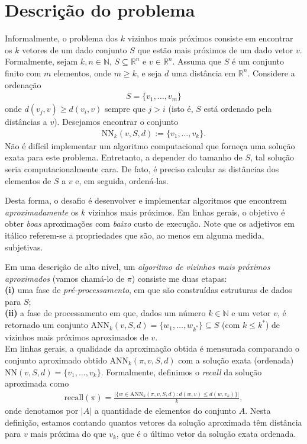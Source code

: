 \documentclass[a4paper,12pt,titlepage]{scrartcl}
\begin{document}
\section{Descrição do problema}

Informalmente, o problema dos $k$ vizinhos mais próximos consiste em encontrar os $k$ vetores de um dado conjunto $S$ que estão mais próximos de um dado vetor $v$. Formalmente, sejam $k,n \in \mathbb{N}$, $S \subseteq \mathbb{R}^n$ e $v \in \mathbb{R}^n$. Assuma que $S$ é um conjunto finito com $m$ elementos, onde $m \geq k$, e seja $d$ uma distância em $\mathbb{R}^n$. Considere a ordenação
\begin{align*} S = \{v_1,\ldots,v_m\}
\end{align*} 
onde $d(v_j,v) \geq d(v_i,v)$ sempre que $j > i$ (isto é, $S$ está ordenado pela distâncias a $v$). Desejamos encontrar o conjunto
\begin{align*} \mathrm{NN}_k(v,S,d) := \{v_1,\ldots,v_k\}. 
\end{align*}
Não é difícil implementar um algoritmo computacional que forneça uma solução exata para este problema. Entretanto, a depender do tamanho de $S$, tal solução seria computacionalmente cara. De fato, é preciso calcular as distâncias dos elementos de $S$ a $v$ e, em seguida, ordená-las.

Desta forma, o desafio é desenvolver e implementar algoritmos que encontrem \emph{aproximadamente} os $k$ vizinhos mais próximos. Em linhas gerais, o objetivo é obter \emph{boas} aproximações com \emph{baixo} custo de execução. Note que os adjetivos em itálico referem-se a propriedades que são, ao menos em alguma medida, subjetivas. 

Em uma descrição de alto nível, um \emph{algoritmo de vizinhos mais próximos aproximados} (vamos chamá-lo de $\pi$) consiste me duas etapas: \\

\noindent\textbf{(i)} uma fase de \emph{pré-processamento}, em que são construídas estruturas de dados para $S$;\\

\noindent\textbf{(ii)} a fase de processamento em que, dados um número $k \in \mathbb{N}$ e um vetor $v$, é retornado um conjunto $\mathrm{ANN}_k(v,S,d)=\{w_1,\ldots,w_{k^*}\} \subseteq S$ (com $k \leq k^*$) de vizinhos mais próximos aproximados de $v$. \\

Em linhas gerais, a qualidade da aproximação obtida é mensurada comparando o conjunto aproximado obtido $\mathrm{ANN}_k(\pi,v,S,d)$ com a solução exata (ordenada) $\mathrm{NN}(v,S,d) = \{v_1,\ldots,v_k\}$. Formalmente, definimos o \emph{recall} da solução aproximada como
\begin{align*} \mathrm{recall}(\pi) = \frac{\Big|\Big\{w \in \mathrm{ANN}_k(\pi,v,S,d) \colon d(w,v) \leq d(w,v_k)\Big\}\Big|}{k},
\end{align*}
onde denotamos por $|A|$ a quantidade de elementos do conjunto $A$. Nesta definição, estamos contando quantos vetores da solução aproximada têm distância para $v$ mais próxima do que $v_k$, que é o último vetor da solução exata ordenada. 
\end{document}
